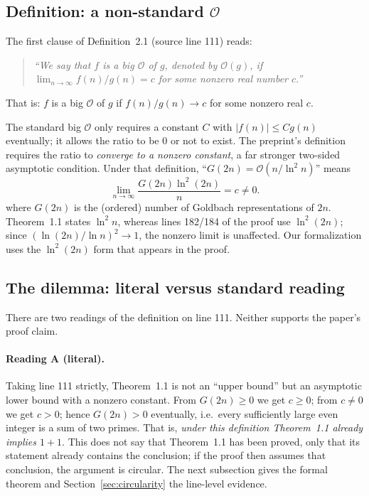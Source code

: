 \documentclass[11pt,a4paper]{article}
\theoremstyle{plain}
\theoremstyle{definition}
\begin{document}
\subsection{Definition: a non-standard $\mathcal O$}
\label{sec:paper-def}

The first clause of Definition~2.1 (source line 111) reads:

\begin{quote}\itshape
``We say that $f$ is a big $\mathcal O$ of $g$, denoted by $\mathcal O(g)$, if
$\lim_{n\to\infty} f(n)/g(n)=c$ for some nonzero real number $c$.''
\end{quote}

\noindent That is: $f$ is a big $\mathcal O$ of $g$ if $f(n)/g(n)\to c$ for some nonzero real $c$.

The standard big $\mathcal O$ only requires a constant $C$ with $|f(n)|\le C g(n)$ eventually; it allows the ratio to be $0$ or not to exist. The preprint's definition requires the ratio to \emph{converge to a nonzero constant}, a far stronger two-sided asymptotic condition. Under that definition, ``$G(2n)=\mathcal O(n/\ln^2 n)$'' means
\begin{equation}
\lim_{n\to\infty}\frac{G(2n)\ln^2(2n)}{n}=c\ne0.
\label{eq:paperO}
\end{equation}
where $G(2n)$ is the (ordered) number of Goldbach representations of $2n$. Theorem~1.1 states $\ln^2 n$, whereas lines 182/184 of the proof use $\ln^2(2n)$; since $(\ln(2n)/\ln n)^2\to1$, the nonzero limit is unaffected. Our formalization uses the $\ln^2(2n)$ form that appears in the proof.

\subsection{The dilemma: literal versus standard reading}
\label{sec:dilemma}

There are two readings of the definition on line 111. Neither supports the paper's proof claim.

\paragraph{Reading A (literal).}
Taking line 111 strictly, Theorem~1.1 is not an ``upper bound'' but an asymptotic lower bound with a nonzero constant. From $G(2n)\ge0$ we get $c\ge0$; from $c\ne0$ we get $c>0$; hence $G(2n)>0$ eventually, i.e.\ every sufficiently large even integer is a sum of two primes. That is, \emph{under this definition Theorem~1.1 already implies $1+1$}. This does not say that Theorem~1.1 has been proved, only that its statement already contains the conclusion; if the proof then assumes that conclusion, the argument is circular. The next subsection gives the formal theorem and Section~\ref{sec:circularity} the line-level evidence.
\end{document}
